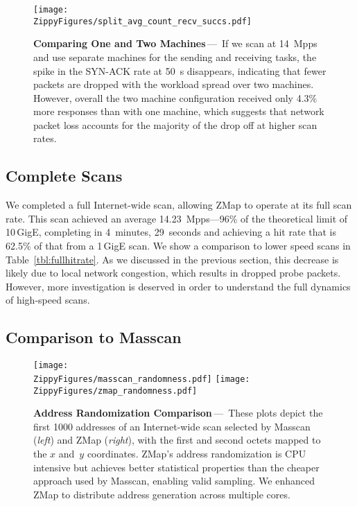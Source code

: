 \begin{figure}\centering
\texttt{[image: \\ZippyFigures/split\_avg\_count\_recv\_succs.pdf]}
\caption{\textbf{Comparing One and Two Machines}\,---\,%
If we scan at 14~Mpps and use separate machines for the sending and receiving
tasks, the spike in the SYN-ACK rate at 50~s disappears, indicating that
fewer packets are dropped with the workload spread over two machines.
However, overall the two machine configuration received only 4.3\% more
responses than with one machine, which suggests that network packet loss
accounts for the majority of the drop off at higher scan rates.}
\label{fig:twomachines}
\end{figure}

\subsection{Complete Scans}

We completed a full Internet-wide scan, allowing ZMap to operate at its full
scan rate. This scan achieved an average 14.23~Mpps---96\% of the theoretical
limit of 10\,GigE, completing in 4~minutes, 29~seconds and achieving a hit
rate that is 62.5\% of that from a 1\,GigE scan. We show a comparison to
lower speed scans in Table~\ref{tbl:fullhitrate}. As we discussed in the
previous section, this decrease is likely due to local network congestion,
which results in dropped probe packets. However, more investigation is
deserved in order to understand the full dynamics of high-speed scans.

\subsection{Comparison to Masscan}
\label{sec:masscan-comparison}

\begin{figure*}\centering
\hfill
\texttt{[image: \\ZippyFigures/masscan\_randomness.pdf]}
\hfill\hfill\texttt{[image: \\ZippyFigures/zmap\_randomness.pdf]}
\hfill\strut
\caption{\textbf{Address Randomization Comparison}\,---\,%
These plots depict the first 1000 addresses of an Internet-wide scan selected
by Masscan (\emph{left}) and ZMap (\emph{right}), with the first and second
octets mapped to the $x$ and~$y$ coordinates. ZMap's address randomization is
CPU intensive but achieves better statistical properties than the cheaper
approach used by Masscan, enabling valid sampling. We enhanced ZMap to
distribute address generation across multiple cores.}
\label{fig:randomy}
\end{figure*}

